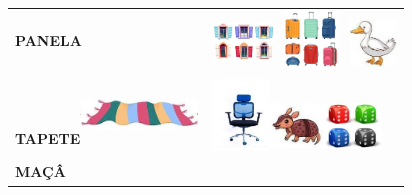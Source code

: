 \begin{longtable}[]{@{}ll@{}}
\begin{minipage}[t]{0.48\columnwidth}
\textbf{PANELA}\strut
\end{minipage} & \begin{minipage}[t]{0.48\columnwidth}\raggedright\strut
\includegraphics[width=0.64097in,height=0.53194in]{media/image54.jpg}\includegraphics[width=0.77778in,height=0.58681in]{media/image55.jpg}\includegraphics[width=0.50000in,height=0.49583in]{media/image56.jpg}\strut
\end{minipage}\tabularnewline
\textbf{TAPETE}\includegraphics[width=1.22986in,height=0.61458in]{media/image57.jpg}
&
\includegraphics[width=0.59375in,height=0.78819in]{media/image58.jpg}\includegraphics[width=0.56458in,height=0.56458in]{media/image59.jpg}\includegraphics[width=0.61042in,height=0.56250in]{media/image60.jpg}\tabularnewline
\begin{minipage}[t]{0.48\columnwidth}\raggedright\strut
\textbf{MAÇÂ}


\end{minipage}
\end{longtable}
